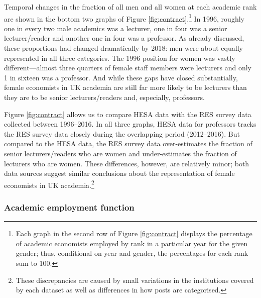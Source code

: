 \documentclass[a4paper, 1]{article}
\begin{document}
Temporal changes in the fraction of all men and all women at each academic rank are shown in the bottom two graphs of Figure \ref{fig:contract}.\footnote{Each graph in the second row of Figure \ref{fig:contract} displays the percentage of academic economists employed by rank in a particular year for the given gender; thus, conditional on year and gender, the percentages for each rank sum to 100.} In 1996, roughly one in every two male academics was a lecturer, one in four was a senior lecturer/reader and another one in four was a professor. As already discussed, these proportions had changed dramatically by 2018: men were about equally represented in all three categories. The 1996 position for women was vastly different---almost three quarters of female staff members were lecturers and only 1 in sixteen was a professor. And while these gaps have closed substantially, female economists in UK academia are still far more likely to be lecturers than they are to be senior lecturers/readers and, especially, professors.

Figure \ref{fig:contract} allows us to compare HESA data with the RES survey data collected between 1996--2016. In all three graphs, HESA data for professors tracks the RES survey data closely during the overlapping period (2012--2016). But compared to the HESA data, the RES survey data over-estimates the fraction of senior lecturers/readers who are women and under-estimates the fraction of lecturers who are women. These differences, however, are relatively minor; both data sources suggest similar conclusions about the representation of female economists in UK academia.\footnote{These discrepancies are caused by small variations in the institutions covered by each dataset as well as differences in how posts are categorised.}

\hypertarget{academic-employment-function}{%
\subsubsection{Academic employment function}\label{academic-employment-function}}
\end{document}
